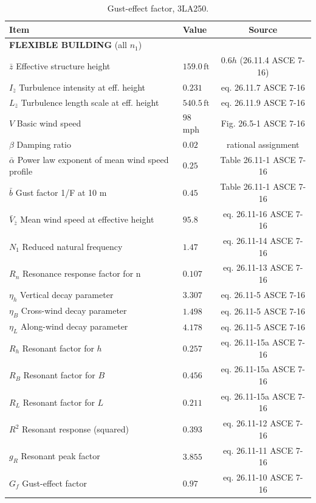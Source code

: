 \documentclass{simcenterdocumentation}
\newcommand{\ft}{\ensuremath{\,\mathrm{ft}}}
\begin{document}
\begin{table}[H]
\centering \caption{Gust-effect factor, 3LA250.}
\label{tab:gust_factor_20SE250}
\begin{tabular}{llc}
\toprule
Item		& Value		& Source		\\
\midrule
\multicolumn{3}{l}{\textbf{FLEXIBLE BUILDING} (all $n_1$)}	\\
$\bar{z}$ Effective structure height							& $159.0 \ft$					& $0.6h$ (26.11.4 ASCE 7-16)	\\
$I_{\bar{z}}$ Turbulence intensity at eff. height				& $0.231$						& eq. 26.11.7 ASCE 7-16			\\
$L_{\bar{z}}$ Turbulence length scale at eff. height			& $540.5 \ft$					& eq. 26.11.9 ASCE 7-16			\\
$V$ Basic wind speed											& $98$ mph						& Fig. 26.5-1 ASCE 7-16			\\
$\beta$ Damping ratio											& $0.02$						& rational assignment			\\
$\bar{\alpha}$ Power law exponent of mean wind speed profile	& $0.25$						& Table 26.11-1 ASCE 7-16		\\
$\bar{b}$ Gust factor 1/F at 10 m								& $0.45$						& Table 26.11-1 ASCE 7-16		\\
$\bar{V}_{\bar{z}}$ Mean wind speed at effective height			& $95.8$						& eq. 26.11-16 ASCE 7-16		\\
$N_1$ Reduced natural frequency									& $1.47$						& eq. 26.11-14 ASCE 7-16		\\
$R_n$ Resonance response factor for n							& $0.107$						& eq. 26.11-13 ASCE 7-16		\\
$\eta_h$ Vertical decay parameter								& $3.307$						& eq. 26.11-5 ASCE 7-16			\\
$\eta_B$ Cross-wind decay parameter								& $1.498$						& eq. 26.11-5 ASCE 7-16			\\
$\eta_L$ Along-wind decay parameter								& $4.178$						& eq. 26.11-5 ASCE 7-16			\\
$R_h$ Resonant factor for $h$									& $0.257$							& eq. 26.11-15a ASCE 7-16			\\
$R_B$ Resonant factor for $B$									& $0.456$							& eq. 26.11-15a ASCE 7-16			\\
$R_L$ Resonant factor for $L$									& $0.211$							& eq. 26.11-15a ASCE 7-16			\\
$R^2$ Resonant response (squared)								& $0.393$							& eq. 26.11-12 ASCE 7-16			\\
$g_R$ Resonant peak factor										& $3.855$							& eq. 26.11-11 ASCE 7-16			\\
$G_f$ Gust-effect factor										& $0.97$							& eq. 26.11-10 ASCE 7-16			\\
\bottomrule
\end{tabular}
\end{table}
\end{document}
